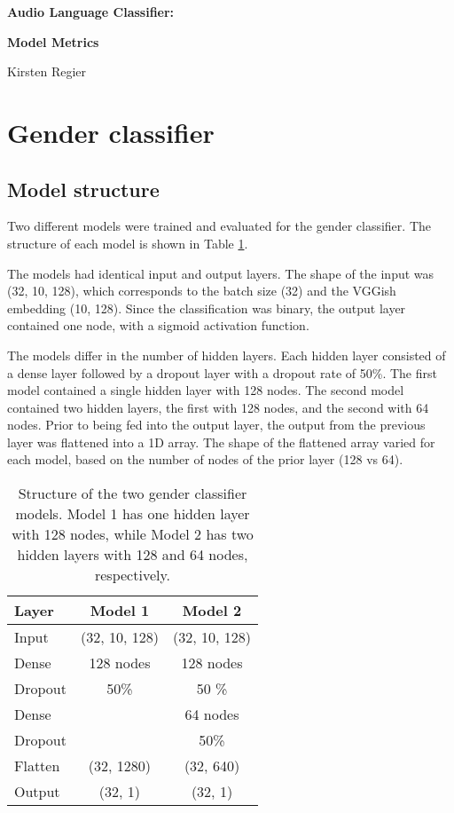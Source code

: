 \documentclass[11pt, letterpaper]{article}
\begin{document}
\begin{center}
\Large{\textbf{Audio Language Classifier:}}

\Large{\textbf{Model Metrics}}

\large{Kirsten Regier}
\end{center}


\section{Gender classifier}
\subsection{Model structure}

Two different models were trained and evaluated for the gender classifier. The structure of each model is shown in Table \ref{tab:GenModels}. 

The models had identical input and output layers. The shape of the input was (32, 10, 128), which corresponds to the batch size (32) and the VGGish embedding (10, 128).  Since the classification was binary, the output layer contained one node, with a sigmoid activation function.

The models differ in the number of hidden layers. Each hidden layer consisted of a dense layer followed by a dropout layer with a dropout rate of 50\%. The first model contained a single hidden layer with 128 nodes. The second model contained two hidden layers, the first with 128 nodes, and the second with 64 nodes. Prior to being fed into the output layer, the output from the previous layer was flattened into a 1D array. The shape of the flattened array varied for each model, based on the number of nodes of the prior layer (128 vs 64).

\begin{table}[!h]
\begin{center}
\caption{Structure of the two gender classifier models. Model 1 has one hidden layer with 128 nodes, while Model 2 has two hidden layers with 128 and 64 nodes, respectively.}
\begin{tabular}{l | c | c |}

Layer  & Model 1 & Model 2\\
\hline

Input 	& (32, 10, 128) & (32, 10, 128) \\ \hline

Dense	& 128 nodes & 128 nodes \\
Dropout	& 50\%		& 50 \% \\ \hline

Dense	&			& 64 nodes \\
Dropout	& 			& 50\% \\ \hline

Flatten 	& (32, 1280)	& (32, 640) \\ \hline
Output 	& (32, 1)		& (32, 1)\\
\hline
\end{tabular}

\label{tab:GenModels}
\end{center}
\end{table}
\end{document}
